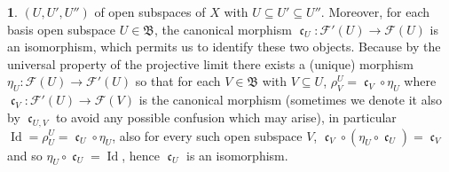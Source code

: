 \documentclass[12pt]{amsart}
\newcommand{\Id}{\operatorname{Id}}
\newcommand{\can}{\operatorname{\mathfrak{c}}}
\theoremstyle{definition}
\newtheorem{bk}[proposition]{}
\begin{document}
\begin{bk}
$(U, U', U'')$ of open subspaces of $X$ with $U\subseteq U'\subseteq U''$. Moreover, for each basis open subspace $U\in\mathfrak{B}$, the canonical morphism $\can_{U}:\mathscr{F}'(U)\rightarrow\mathscr{F}(U)$ is an isomorphism, which permits us to identify these two objects. Because by the universal property of the projective limit there exists a (unique) morphism $\eta_{U}:\mathscr{F}(U)\rightarrow\mathscr{F}'(U)$ so that  for each $V\in\mathfrak{B}$ with $V\subseteq U$, $\rho_{V}^{U}=\can_{V}\circ\eta_{U}$ where $\can_{V}:\mathscr{F}'(U)\rightarrow\mathscr{F}(V)$ is the canonical morphism (sometimes we denote it also by $\can_{U, V}$ to avoid any possible confusion which may arise), in particular $\Id=\rho_{U}^{U}=\can_{U}\circ\eta_{U}$, also for every such open subspace $V$, $\can_{V}\circ(\eta_{U}\circ\can_{U})=\can_{V}$ and so $\eta_{U}\circ\can_{U}=\Id$, hence $\can_{U}$ is an isomorphism.\\
\end{bk}
\end{document}
